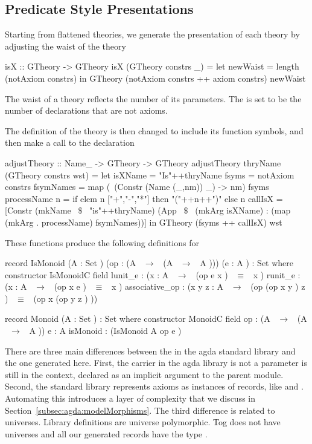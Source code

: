 \subsection{Predicate Style Presentations}
Starting from flattened theories, we generate the  presentation of each theory by adjusting the waist of the theory
\begin{hscode}
isX :: GTheory -> GTheory
isX (GTheory constrs _) =
  let newWaist = length (notAxiom constrs) 
  in GTheory (notAxiom constrs ++ axiom constrs) newWaist
\end{hscode}
The waist of a theory reflects the number of its parameters. The  is set to be the number of declarations that are not axioms. 

The definition of the theory  is then changed to include its function symbols, and then make a call to the  declaration 
\begin{hscode}
adjustTheory :: Name_ -> GTheory -> GTheory
adjustTheory thryName (GTheory constrs wst) =
  let isXName = "Is"++thryName
      fsyms = notAxiom constrs
      fsymNames = map (\ (Constr (Name (_,nm)) _) -> nm) fsyms
      processName n = if elem n ["+","-","*"] then "("++n++")" else n 
      callIsX = [Constr (mkName ~$\$$~ "is"++thryName)
                     (App ~$\$$~ (mkArg isXName) 
                          : (map (mkArg . processName) fsymNames))]
  in GTheory (fsyms ++ callIsX) wst 
\end{hscode} 
These functions produce the following definitions for 
\begin{agdacode}
record IsMonoid (A  : Set ) (op  : (A  ~$\to$~ (A ~$\to$~ A ))) (e  : A )  : Set where
  constructor IsMonoidC
  field
   lunit_e : ({x  : A }  ~$\to$~ (op e x ) ~$\equiv$~ x )
   runit_e : ({x  : A }  ~$\to$~ (op x e ) ~$\equiv$~ x )
   associative_op : ({x y z  : A }  ~$\to$~ (op (op x y ) z ) ~$\equiv$~ (op x (op y z ) )) 

record Monoid (A  : Set )  : Set where
  constructor MonoidC
  field
   op : (A  ~$\to$~ (A  ~$\to$~ A ))
   e : A 
   isMonoid : (IsMonoid A op e ) 
\end{agdacode}
There are three main differences between the  in the agda standard library and the one generated here. First, the carrier in the agda library is not a parameter is still in the context, declared as an implicit argument to the parent module. 
Second, the standard library represents axioms as instances of records, like  and . Automating this introduces a layer of complexity that we discuss in Section~\ref{subsec:agda:modelMorphisms}. The third difference is related to universes. Library definitions are universe polymorphic. Tog does not have universes and all our generated records have the type . 

